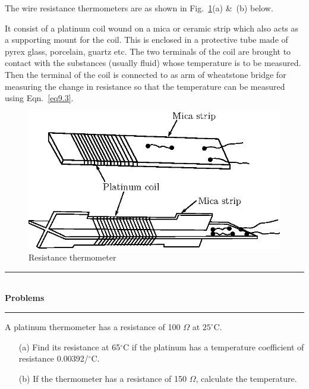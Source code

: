 
The wire resistance thermometers are as shown in Fig.~\ref{fig9.2}(a) \&\ (b) below.

It consist of a platinum coil wound on a mica or ceramic strip which
also acts as a supporting  mount for the coil. This is enclosed in a
protective tube made of pyrex glass, porcelain, guartz etc. The two
terminals of the coil are brought to contact with the substances
(usually fluid) whose temperature is to be measured. Then the
terminal of the coil is connected to as arm of wheatstone bridge for
measuring the change in resistance so that the temperature can be
measured using Eqn.~\eqref{eq9.3}.
\begin{figure}[H]
\centering
\includegraphics{chap9/fig9.1a.eps}
\caption{Resistance thermometer}\label{fig9.2}
\end{figure}

\begin{center}
\rule{4cm}{1pt}\\
{\bf\Large Problems}\\[-3pt]
\rule{4cm}{1pt}
\end{center}

\begin{problem}\label{prob9.1}
A platinum thermometer has a resistance of 100 $\Omega$ at $25^\circ$C.
\begin{itemize}
\item[(a)] Find its resistance at 65$^\circ$C if the platinum has a
temperature coefficient of resistance 0.00392/$^\circ$C.

\item[(b)] If the thermometer has a resistance of 150 $\Omega$,
calculate the temperature.
\end{itemize}
\end{problem}

